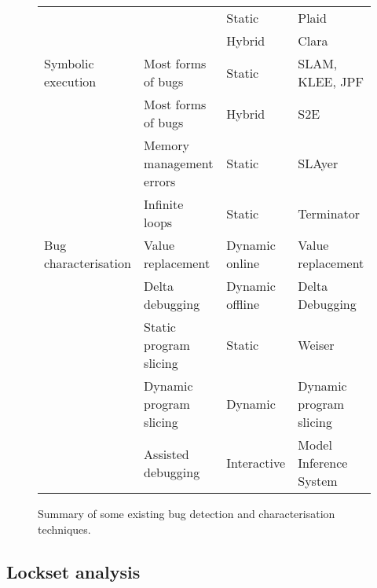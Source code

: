 \begin{sidewaysfigure}
\begin{figgure}
\begin{tabular}{l>{\RaggedRight\arraybackslash}p{5.5cm}lp{10.3cm}}
                               &                                                                             & Static  & Plaid\cite{Sunshine2011}\\
                               &                                                                             & Hybrid  & Clara\cite{Bodden2010}\\
    \hdashline
    Symbolic execution         & Most forms of bugs                           & Static          & SLAM\cite{Ball2011}, KLEE\cite{Cadar}, JPF\cite{Havelund2000} \\
                               & Most forms of bugs                           & Hybrid          & S2E\cite{Chipounov2011} \\
                               & Memory management errors                     & Static          & SLAyer\cite{Berdine2011} \\
                               & Infinite loops                               & Static          & Terminator\cite{Cook2006a} \\
    \hline
    Bug characterisation       & Value replacement                            & Dynamic online  & Value replacement\cite{Jeffrey2009} \\
                               & Delta debugging                              & Dynamic offline & Delta Debugging\cite{Cleve2005,Choi2002} \\
                               & Static program slicing                       & Static          & Weiser\cite{Weiser1981} \\
                               & Dynamic program slicing                      & Dynamic         & Dynamic program slicing\cite{Agrawal1990a} \\
                               & Assisted debugging                           & Interactive     & Model Inference System\cite{Shapiro1982} \\
  \end{tabular}
  \caption{Summary of some existing bug detection and characterisation
    techniques.}
  \label{fig:rw:find_char}
  \end{figgure}
\end{sidewaysfigure}

\subsection{Lockset analysis}

